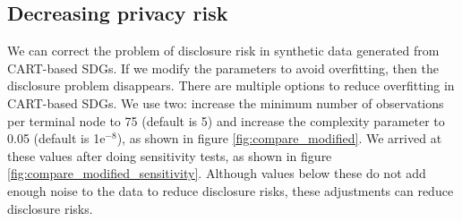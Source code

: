 \documentclass[runningheads]{llncs}
\begin{document}
\subsection{Decreasing privacy risk}

We can correct the problem of disclosure risk in synthetic data generated from CART-based SDGs.  If we modify the parameters to avoid overfitting, then the disclosure problem disappears.  There are multiple options to reduce overfitting in CART-based SDGs.  We use two: increase the minimum number of observations per terminal node to 75 (default is 5) and increase the complexity parameter to 0.05 (default is 1e$^{-8}$), as shown in figure \ref{fig:compare_modified}.  We arrived at these values after doing sensitivity tests, as shown in figure \ref{fig:compare_modified_sensitivity}.  Although values below these do not add enough noise to the data to reduce disclosure risks, these adjustments can reduce disclosure risks.
\end{document}
